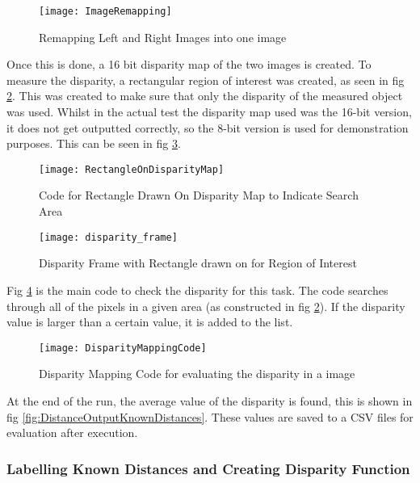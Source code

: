 \documentclass[conference]{IEEEtran}
\begin{document}
\begin{figure}[H]
\centerline{\texttt{[image: ImageRemapping]}}
\caption{Remapping Left and Right Images into one image}
\label{fig:ImageRemapping}
\end{figure}

Once this is done, a 16 bit disparity map of the two images is created. To measure the disparity, a rectangular region of interest was created, as seen in fig \ref{fig:RectangleOnDisparityMap}. This was created to make sure that only the disparity of the measured object was used. Whilst in the actual test the disparity map used was the 16-bit version, it does not get outputted correctly, so the 8-bit version is used for demonstration purposes. This can be seen in fig \ref{fig:disparity_frame}.

\begin{figure}[H]
\centerline{\texttt{[image: RectangleOnDisparityMap]}}
\caption{Code for Rectangle Drawn On Disparity Map to Indicate Search Area}
\label{fig:RectangleOnDisparityMap}
\end{figure}

\begin{figure}[H]
\centerline{\texttt{[image: disparity\_frame]}}
\caption{Disparity Frame with Rectangle drawn on for Region of Interest}
\label{fig:disparity_frame}
\end{figure}

Fig \ref{fig:DisparityMappingCode} is the main code to check the disparity for this task. The code searches through all of the pixels in a given area (as constructed in fig \ref{fig:RectangleOnDisparityMap}). If the disparity value is larger than a certain value, it is added to the list. 

\begin{figure}[H]
\centerline{\texttt{[image: DisparityMappingCode]}}
\caption{Disparity Mapping Code for evaluating the disparity in a image}
\label{fig:DisparityMappingCode}
\end{figure}

At the end of the run, the average value of the disparity is found, this is shown in fig \ref{fig:DistanceOutputKnownDistances}. These values are saved to a CSV files for evaluation after execution. 

\subsubsection{Labelling Known Distances and Creating Disparity Function}
\end{document}
